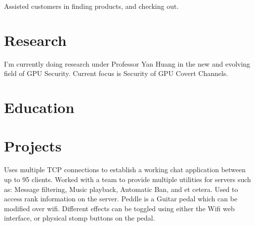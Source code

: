 \documentclass[]{deedy-resume-openfont}
\begin{document}
\begin{tightemize}
\item Assisted customers in finding products, and checking out.
\end{tightemize}
\sectionsep


\section{Research}
I’m currently doing research under Professor Yan Huang in the new and evolving field of GPU Security.
\newline
Current focus is Security of GPU Covert Channels.
\sectionsep


\section{Education}
\sectionsep


\section{Projects}
Uses multiple TCP connections to establish a working chat application
between up to 95 clients.
\newline
{}
Worked with a team to provide multiple utilities for
servers such as: 
\newline
Message filtering, Music playback, Automatic Ban, and et cetera.
\newline
{}
Used to access rank information on the server.
\newline
{}
Peddle is a Guitar pedal which can be
modified over wifi. Different effects can be toggled using either the Wifi web interface, 
or physical stomp buttons on the pedal.
\sectionsep
\end{document}
